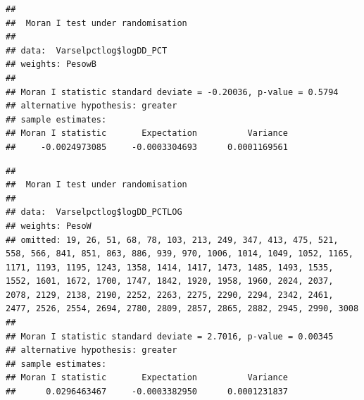 \documentclass[11pt,]{article}
\newenvironment{Shaded}{\begin{snugshade}}{\end{snugshade}}
\newcommand{\KeywordTok}[1]{\textcolor[rgb]{0.13,0.29,0.53}{\textbf{#1}}}
\newcommand{\DataTypeTok}[1]{\textcolor[rgb]{0.13,0.29,0.53}{#1}}
\newcommand{\StringTok}[1]{\textcolor[rgb]{0.31,0.60,0.02}{#1}}
\newcommand{\OperatorTok}[1]{\textcolor[rgb]{0.81,0.36,0.00}{\textbf{#1}}}
\newcommand{\NormalTok}[1]{#1}
\begin{document}
\begin{verbatim}
## 
##  Moran I test under randomisation
## 
## data:  Varselpctlog$logDD_PCT  
## weights: PesowB    
## 
## Moran I statistic standard deviate = -0.20036, p-value = 0.5794
## alternative hypothesis: greater
## sample estimates:
## Moran I statistic       Expectation          Variance 
##     -0.0024973085     -0.0003304693      0.0001169561
\end{verbatim}

\begin{Shaded}
\end{Shaded}

\begin{verbatim}
## 
##  Moran I test under randomisation
## 
## data:  Varselpctlog$logDD_PCTLOG  
## weights: PesoW 
## omitted: 19, 26, 51, 68, 78, 103, 213, 249, 347, 413, 475, 521, 558, 566, 841, 851, 863, 886, 939, 970, 1006, 1014, 1049, 1052, 1165, 1171, 1193, 1195, 1243, 1358, 1414, 1417, 1473, 1485, 1493, 1535, 1552, 1601, 1672, 1700, 1747, 1842, 1920, 1958, 1960, 2024, 2037, 2078, 2129, 2138, 2190, 2252, 2263, 2275, 2290, 2294, 2342, 2461, 2477, 2526, 2554, 2694, 2780, 2809, 2857, 2865, 2882, 2945, 2990, 3008   
## 
## Moran I statistic standard deviate = 2.7016, p-value = 0.00345
## alternative hypothesis: greater
## sample estimates:
## Moran I statistic       Expectation          Variance 
##      0.0296463467     -0.0003382950      0.0001231837
\end{verbatim}

\begin{Shaded}
\end{Shaded}
\end{document}
